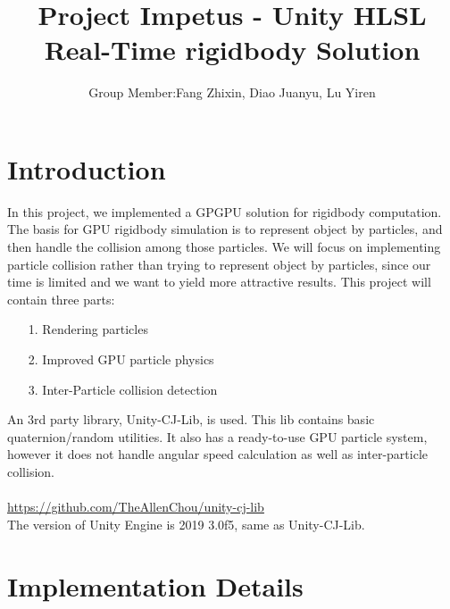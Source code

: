 \documentclass[acmtog]{acmart}
\title{Project Impetus - Unity HLSL Real-Time rigidbody Solution}
\author{Group Member:\quad Fang Zhixin, Diao Juanyu, Lu Yiren 
	}
\begin{document}
\maketitle

\vspace*{2 ex}


\section{Introduction}
\large
In this project, we implemented a GPGPU solution for rigidbody computation. The basis for GPU rigidbody simulation is to represent object by particles, and then handle the collision among those particles. We will focus on implementing particle collision rather than trying to represent object by particles, since our time is limited and we want to yield more attractive results.
This project will contain three parts:
\begin{enumerate}
	\item [1.] Rendering particles
	\item [2.] Improved GPU particle physics
	\item [3.] Inter-Particle collision detection
\end{enumerate}
An 3rd party library, Unity-CJ-Lib, is used. This lib contains basic quaternion/random utilities. It also has a ready-to-use GPU particle system, however it does not handle angular speed calculation as well as inter-particle collision. \\
\quad \\
\url{https://github.com/TheAllenChou/unity-cj-lib}\\
The version of Unity Engine is 2019 3.0f5, same as Unity-CJ-Lib.
\section{Implementation Details}
\end{document}
